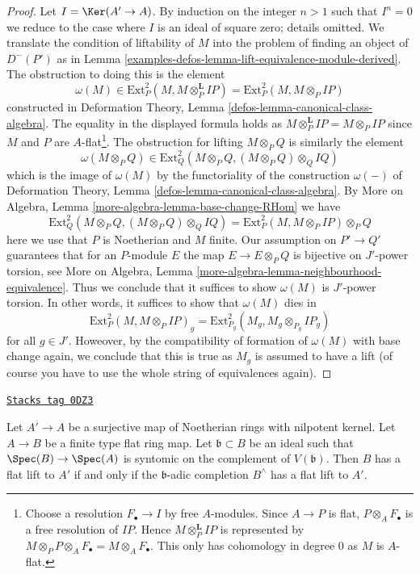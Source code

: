\begin{proof}
Let $I = \Ker(A' \to A)$. By induction on the integer $n > 1$
such that $I^n = 0$ we reduce to the case where $I$ is an ideal
of square zero; details omitted.
We translate the condition of liftability of
$M$ into the problem of finding an object of $D^-(P')$ as in
Lemma \ref{examples-defos-lemma-lift-equivalence-module-derived}.
The obstruction to doing this is the element
$$
\omega(M) \in \text{Ext}^2_P(M, M \otimes_P^\mathbf{L} IP) =
\text{Ext}^2_P(M, M \otimes_P IP)
$$
constructed in
Deformation Theory, Lemma \ref{defos-lemma-canonical-class-algebra}.
The equality in the displayed formula holds as
$M \otimes_P^\mathbf{L} IP = M \otimes_P IP$
since $M$ and $P$ are $A$-flat\footnote{Choose a resolution
$F_\bullet \to I$ by free $A$-modules. Since $A \to P$ is flat,
$P \otimes_A F_\bullet$ is a free resolution of $IP$.
Hence $M \otimes_P^\mathbf{L} IP$ is represented by
$M \otimes_P P \otimes_A F_\bullet = M \otimes_A F_\bullet$.
This only has cohomology in degree $0$ as $M$ is $A$-flat.}.
The obstruction for lifting $M \otimes_P Q$ is similarly
the element
$$
\omega(M \otimes_P Q) \in
\text{Ext}^2_Q(M \otimes_P Q, (M \otimes_P Q) \otimes_Q IQ)
$$
which is the image of $\omega(M)$ by the functoriality
of the construction $\omega(-)$ of
Deformation Theory, Lemma \ref{defos-lemma-canonical-class-algebra}.
By More on Algebra, Lemma \ref{more-algebra-lemma-base-change-RHom}
we have
$$
\text{Ext}^2_Q(M \otimes_P Q, (M \otimes_P Q) \otimes_Q IQ) =
\text{Ext}^2_P(M, M \otimes_P IP) \otimes_P Q
$$
here we use that $P$ is Noetherian and $M$ finite.
Our assumption on $P' \to Q'$ guarantees that for an $P$-module $E$
the map $E \to E \otimes_P Q$ is bijective on $J'$-power torsion, see
More on Algebra, Lemma
\ref{more-algebra-lemma-neighbourhood-equivalence}.
Thus we conclude that it suffices to show $\omega(M)$
is $J'$-power torsion. In other words, it suffices to show that
$\omega(M)$ dies in
$$
\text{Ext}^2_P(M, M \otimes_P IP)_g =
\text{Ext}^2_{P_g}(M_g, M_g \otimes_{P_g} IP_g)
$$
for all $g \in J'$. Howeover, by the compatibility of formation of $\omega(M)$
with base change again, we conclude that this is true as $M_g$
is assumed to have a lift (of course you have to use the whole
string of equivalences again).
\end{proof}

\begin{lemma}
\label{examples-defos-lemma-lift-equivalence}
\href{https://stacks.math.columbia.edu/tag/0DZ3}{\texttt{Stacks tag 0DZ3}}

Let $A' \to A$ be a surjective map of Noetherian rings with nilpotent kernel.
Let $A \to B$ be a finite type flat ring map.
Let $\mathfrak b \subset B$ be an ideal such that
$\Spec(B) \to \Spec(A)$ is syntomic on the complement of $V(\mathfrak b)$.
Then $B$ has a flat lift to $A'$ if and only if the $\mathfrak b$-adic
completion $B^\wedge$ has a flat lift to $A'$.
\end{lemma}

